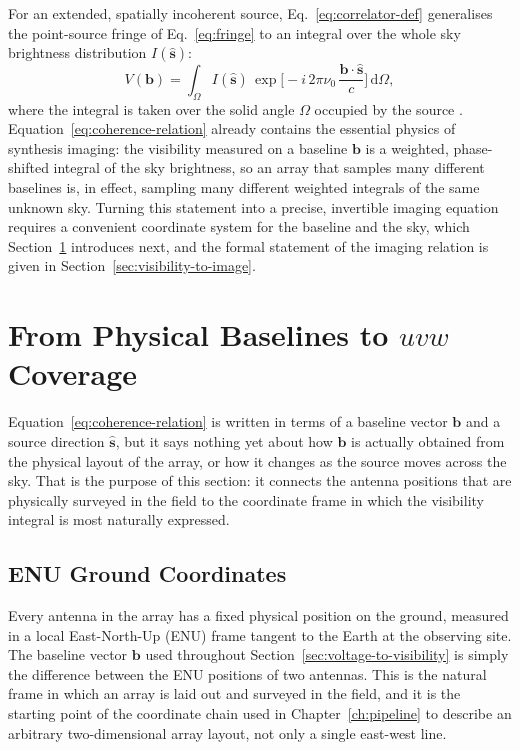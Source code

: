 For an extended, spatially incoherent source, Eq.~\eqref{eq:correlator-def}
generalises the point-source fringe of Eq.~\eqref{eq:fringe} to an integral
over the whole sky brightness distribution $I(\hat{\bm{s}})$:
\begin{equation}
  V(\bm{b}) = \int_{\Omega} I(\hat{\bm{s}})\,
  \exp\!\Big[-i\,2\pi\nu_0\,\frac{\bm{b}\cdot\hat{\bm{s}}}{c}\Big]\,\mathrm{d}\Omega ,
  \label{eq:coherence-relation}
\end{equation}
where the integral is taken over the solid angle $\Omega$ occupied by the
source \citep{taylor1999synthesis,tms2017}. Equation~\eqref{eq:coherence-relation}
already contains the essential physics of synthesis imaging: the visibility
measured on a baseline $\bm{b}$ is a weighted, phase-shifted integral of the
sky brightness, so an array that samples many different baselines is, in
effect, sampling many different weighted integrals of the same unknown sky.
Turning this statement into a precise, invertible imaging equation requires a
convenient coordinate system for the baseline and the sky, which
Section~\ref{sec:uvw-coverage} introduces next, and the formal statement of
the imaging relation is given in Section~\ref{sec:visibility-to-image}.

\section{From Physical Baselines to \texorpdfstring{$uvw$}{uvw} Coverage}
\label{sec:uvw-coverage}
Equation~\eqref{eq:coherence-relation} is written in terms of a baseline
vector $\bm{b}$ and a source direction $\hat{\bm{s}}$, but it says nothing yet
about how $\bm{b}$ is actually obtained from the physical layout of the array,
or how it changes as the source moves across the sky. That is the purpose of
this section: it connects the antenna positions that are physically surveyed
in the field to the coordinate frame in which the visibility integral is most
naturally expressed.

\subsection{ENU Ground Coordinates}
\label{subsec:enu}
Every antenna in the array has a fixed physical position on the ground,
measured in a local East-North-Up (ENU) frame tangent to the Earth at the
observing site. The baseline vector $\bm{b}$ used throughout
Section~\ref{sec:voltage-to-visibility} is simply the difference between the
ENU positions of two antennas. This is the natural frame in which an array is
laid out and surveyed in the field, and it is the starting point of the
coordinate chain used in Chapter~\ref{ch:pipeline} to describe an arbitrary
two-dimensional array layout, not only a single east-west line.

